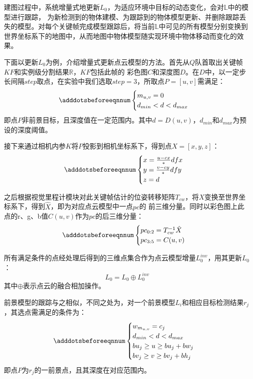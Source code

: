 建图过程中，系统增量式地更新$L_{0}$，为适应环境中目标的动态变化，会对$\mathbb{L}$中的模型进行跟踪，
为新检测到的物体建模、为跟踪到的物体模型更新、并删除跟踪丢失的模型。对每个关键帧完成模型跟踪后，将当前$\mathbb{L}$中可见的所有模型分别变换到
世界坐标系下的地图中，从而地图中物体模型随实现环境中物体移动而变化的效果。

下面以更新$L_{0}$为例，介绍增量式更新点云模型的方法。首先从$Q$队首取出关键帧$KF$和实例级分割结果$\mathbb{R}$，$KF$包括此帧的
彩色图$C$和深度图$D$。在$D$中，以一定步长间隔$step$取点，在实验中我们选取$step=3$，所取点$P=[u, v]$需满足：
\begin{equation} 
    \adddotsbeforeeqnnum%
    \begin{cases}
        m_{u,v}=0\\
        d_{min}<d<d_{max}\\
    \end{cases}
\end{equation}
即点$P$非前景目标，且深度值在一定范围内。其中$d=D(u,v)$，$d_{min}$和$d_{max}$为预设的深度阈值。

接下来通过相机内参$K$将$P$投影到相机坐标系下，得到点$X=[x,y,z]$：
\begin{equation} 
    \adddotsbeforeeqnnum%
    \begin{cases}
        x=\frac{u-cx}*d{fx}\\
        y=\frac{v-cy}*d{fy}\\
        z=d
    \end{cases}
\end{equation}

之后根据视觉里程计模块对此关键帧估计的位姿转移矩阵$T_{cw}$，将$X$变换至世界坐标系下，得到$\hat{X}$，即为对应点云模型中一点$pc$的
前三维分量。同时以彩色图上此点的r、g、b值$C(u,v)$作为$pc$的后三维分量：
\begin{equation} 
    \adddotsbeforeeqnnum%
    \begin{cases}
        pc_{0:2}=T_{cw}^{-1}\hat{X}\\
        pc_{3:5}=C(u,v)\\ 
    \end{cases}
\end{equation}

所有满足条件的点经处理后得到的三维点集合作为点云模型增量$L_{0}^{inv}$，用其更新$L_{0}$：
$$L_{0}=L_{0} \oplus L_{0}^{inv}$$
其中$\oplus$表示点云的融合相加操作。

前景模型的跟踪与之相似，不同之处为，对一个前景模型$L_{i}$和相应目标检测结果$r_{j}$，其选点需满足的条件为：
\begin{equation} 
    \adddotsbeforeeqnnum%
    \begin{cases}
        w_{m_{u,v}}=c_{j}\\
        d_{min}<d<d_{max}\\
        bu_{j}\geq u\geq bu_{j}+bw_{j}\\
        bv_{j}\geq v\geq bv_{j}+bh_{j}\\
    \end{cases}
\end{equation}
即点$P$为$r_{j}$的一前景点，且其深度在对应范围内。


